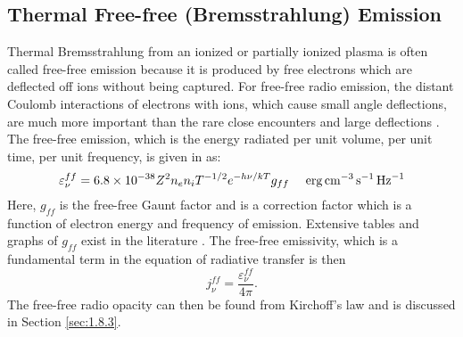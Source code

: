 \subsection{Thermal Free-free (Bremsstrahlung) Emission}\label{sec:1.7.1}
Thermal Bremsstrahlung from an ionized or partially ionized plasma is often called free-free emission because it is produced by free electrons which are deflected off ions without being captured. For free-free radio emission, the distant Coulomb interactions of electrons with ions, which cause small angle deflections, are much more important than the rare close encounters and large deflections \citep{dulk_1985}. The free-free emission, which is the energy radiated per unit volume, per unit time, per unit frequency, is given in \cite{rybicki_1979} as:
\begin{equation}\label{eq:1.7.1}
\varepsilon _{\nu} ^{ff} = 6.8 \times 10^{-38}Z^{2}n_{e}n_{i}T^{-1/2}e^{-h\nu /kT}g_{ff}\ \ \ \ \rm{erg}\,\rm{cm}^{-3}\,s^{-1}\,\rm{Hz}^{-1}
\end{equation}
Here, $g_{ff}$ is the free-free Gaunt factor and is a correction factor which is a function of electron energy and frequency of emission. Extensive tables and graphs of $g_{ff}$ exist in the literature \citep[e.g.,][]{karzas_1961}. The free-free emissivity, which is a fundamental term in the equation of radiative transfer is then
\begin{equation}\label{eq:1.7.2a}
j_{\nu} ^{ff}=\frac{\varepsilon _{\nu} ^{ff}}{4\pi}.
\end{equation}
The free-free radio opacity can then be found from Kirchoff's law and is discussed in Section \ref{sec:1.8.3}.

